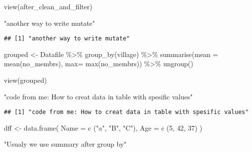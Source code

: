\documentclass[
]{article}
\newenvironment{Shaded}{\begin{snugshade}}{\end{snugshade}}
\newcommand{\AttributeTok}[1]{\textcolor[rgb]{0.77,0.63,0.00}{#1}}
\newcommand{\DecValTok}[1]{\textcolor[rgb]{0.00,0.00,0.81}{#1}}
\newcommand{\FunctionTok}[1]{\textcolor[rgb]{0.00,0.00,0.00}{#1}}
\newcommand{\NormalTok}[1]{#1}
\newcommand{\OtherTok}[1]{\textcolor[rgb]{0.56,0.35,0.01}{#1}}
\newcommand{\SpecialCharTok}[1]{\textcolor[rgb]{0.00,0.00,0.00}{#1}}
\newcommand{\StringTok}[1]{\textcolor[rgb]{0.31,0.60,0.02}{#1}}
\begin{document}
\begin{Shaded}
\begin{Highlighting}[]
\FunctionTok{view}\NormalTok{(after\_clean\_and\_filter)}

\StringTok{"another way to write mutate"}
\end{Highlighting}
\end{Shaded}

\begin{verbatim}
## [1] "another way to write mutate"
\end{verbatim}

\begin{Shaded}
\begin{Highlighting}[]
\NormalTok{grouped }\OtherTok{\textless{}{-}}\NormalTok{ Datafile }\SpecialCharTok{\%\textgreater{}\%} 
  \FunctionTok{group\_by}\NormalTok{(village) }\SpecialCharTok{\%\textgreater{}\%} 
  \FunctionTok{summarise}\NormalTok{(}\AttributeTok{mean =} \FunctionTok{mean}\NormalTok{(no\_membrs), }\AttributeTok{max=} \FunctionTok{max}\NormalTok{(no\_membrs)) }\SpecialCharTok{\%\textgreater{}\%} 
  \FunctionTok{ungroup}\NormalTok{()}

\FunctionTok{view}\NormalTok{(grouped)}
\end{Highlighting}
\end{Shaded}

\begin{Shaded}
\begin{Highlighting}[]
\StringTok{"code from me: How to creat data in table with spesific values"}
\end{Highlighting}
\end{Shaded}

\begin{verbatim}
## [1] "code from me: How to creat data in table with spesific values"
\end{verbatim}

\begin{Shaded}
\begin{Highlighting}[]
\NormalTok{dff }\OtherTok{\textless{}{-}} \FunctionTok{data.frame}\NormalTok{(}
  \AttributeTok{Name =} \FunctionTok{c}\NormalTok{ (}\StringTok{"a"}\NormalTok{, }\StringTok{"B"}\NormalTok{, }\StringTok{"C"}\NormalTok{),}
  \AttributeTok{Age =} \FunctionTok{c}\NormalTok{ (}\DecValTok{5}\NormalTok{, }\DecValTok{42}\NormalTok{, }\DecValTok{37}\NormalTok{)}
\NormalTok{)}
\end{Highlighting}
\end{Shaded}

\begin{Shaded}
\begin{Highlighting}[]
\StringTok{"Usualy we use summary after group by"}
\end{Highlighting}
\end{Shaded}
\end{document}
